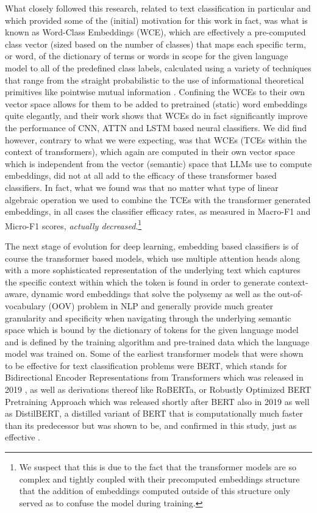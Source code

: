 \documentclass[final]{clv2025}
\begin{document}
What closely followed this research, related to text classification in particular and which provided some of the (initial) motivation for this work in fact, was what is known as Word-Class Embeddings (WCE), which are effectively a pre-computed class vector (sized based on the number of classes) that maps each specific term, or word, of the dictionary of terms or words in scope for the given language model to all of the predefined class labels, calculated using a variety of techniques that range from the straight probabilistic to the use of informational theoretical primitives like pointwise mutual information \cite{moreo}. Confining the WCEs to their own vector space allows for them to be added to pretrained (static) word embeddings quite elegantly, and their work shows that WCEs do in fact significantly improve the performance of CNN, ATTN and LSTM based neural classifiers. We did find however, contrary to what we were expecting, was that WCEs (TCEs within the context of transformers), which again are computed in their own vector space which is independent from the vector (semantic) space that LLMs use to compute embeddings, did not at all add to the efficacy of these transformer based classifiers. In fact, what we found was that no matter what type of linear algebraic operation we used to combine the TCEs with the transformer generated embeddings, in all cases the classifier efficacy rates, as measured in Macro-F1 and Micro-F1 scores, \textit{actually decreased}.\footnote{We suspect that this is due to the fact that the transformer models are so complex and tightly coupled with their precomputed embeddings structure that the addition of embeddings computed outside of this structure only served as to confuse the model during training.}  

The next stage of evolution for deep learning, embedding based classifiers is of course the transformer based models, which use multiple attention heads along with a more sophisticated representation of the underlying text which captures the specific context within which the token is found in order to generate context-aware, dynamic word embeddings that solve the polysemy as well as the out-of-vocabulary (OOV) problem in NLP and generally provide much greater granularity and specificity when navigating through the underlying semantic space which is bound by the dictionary of tokens for the given language model and is defined by the training algorithm and pre-trained data which the language model was trained on.  Some of the earliest transformer models that were shown to be effective for text classification problems were BERT, which stands for Bidirectional Encoder Representations from Transformers which was released in 2019 \cite{devlin-etal-2019-bert}, as well as derivations thereof like RoBERTa, or Robustly Optimized BERT Pretraining Approach which was released shortly after BERT also in 2019 \cite{liu2019roberta} as well as DistilBERT, a distilled  \cite{hinton2015distilling} variant of BERT that is computationally much faster than its predecessor but was shown to be, and confirmed in this study, just as effective \cite{sanh2020distilbert}. 
\end{document}

